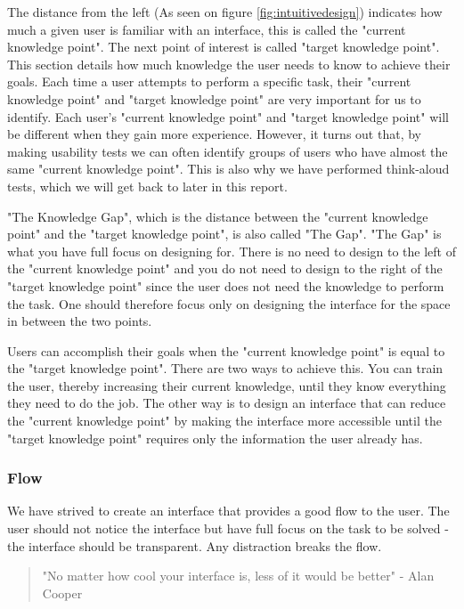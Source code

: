 The distance from the left (As seen on figure \ref{fig:intuitivedesign}) indicates how much a given user is familiar with an interface, this is called the "current knowledge point". The next point of interest is called "target knowledge point". This section details how much knowledge the user needs to know to achieve their goals.
Each time a user attempts to perform a specific task, their "current knowledge point" and "target knowledge point" are very important for us to identify.
Each user's "current knowledge point" and "target knowledge point" will be different when they gain more experience. However, it turns out that, by making usability tests we can often identify groups of users who have almost the same "current knowledge point". This is also why we have performed think-aloud tests, which we will get back to later in this report.

"The Knowledge Gap", which is the distance between the "current knowledge point" and the "target knowledge point", is also called "The Gap".
"The Gap" is what you have full focus on designing for. There is no need to design to the left of the "current knowledge point" and you do not need to design to the right of the "target knowledge point" since the user does not need the knowledge to perform the task. One should therefore focus only on designing the interface for the space in between the two points.

Users can accomplish their goals when the "current knowledge point" is equal to the "target knowledge point". There are two ways to achieve this. You can train the user, thereby increasing their current knowledge, until they know everything they need to do the job. The other way is to design an interface that can reduce the "current knowledge point" by making the interface more accessible until the "target knowledge point" requires only the information the user already has.

\subsubsection{Flow}
We have strived to create an interface that provides a good flow to the user. The user should not notice the interface but have full focus on the task to be solved - the interface should be transparent. Any distraction breaks the flow.

\begin{quotation}
"No matter how cool your interface is, less of it would be better"
- Alan Cooper
\end{quotation}

